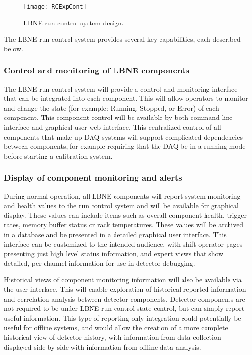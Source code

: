 \begin{figure}[htb]
  \centering
  \begin{center}
    \texttt{[image: RCExpCont]}
  \end{center}
    \caption[Run control system]{LBNE run control system design.}
  \label{fig:expcont}
\end{figure}
The LBNE run control system provides several key capabilities, each described below.

\subsubsection{Control and monitoring of LBNE components}
The LBNE run control system will provide a control and monitoring
interface that can be integrated into each component.  This will allow
operators to monitor and change the state (for example: Running,
Stopped, or Error) of each component.  This component control will be
available by both command line interface and graphical user web
interface.  This centralized control of all components that make up
DAQ systems will support complicated dependencies between components,
for example requiring that the DAQ be in a running mode before
starting a calibration system.

\subsubsection{Display of component monitoring and alerts}
During normal operation, all LBNE components will report system
monitoring and health values to the run control system and will be
available for graphical display.  These values can include items such
as overall component health, trigger rates, memory buffer status or
rack temperatures.  These values will be archived in a database and be
presented in a detailed graphical user interface.  This interface can
be customized to the intended audience, with shift operator pages
presenting just high level status information, and expert views that
show detailed, per-channel information for use in detector debugging.

Historical views of component monitoring information will also be
available via the user interface.  This will enable exploration of
historical reported information and correlation analysis between
detector components.  Detector components are not required to be under
LBNE run control state control, but can simply report useful
information.  This type of reporting-only integration could
potentially be useful for offline systems, and would allow the
creation of a more complete historical view of detector history, with
information from data collection displayed side-by-side with
information from offline data analysis.

